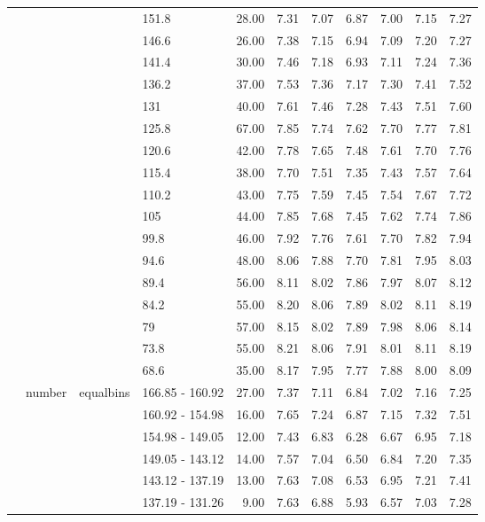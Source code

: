 \begin{longtable}{llllrrrrrrr}
   &  &  & 151.8 & 28.00 & 7.31 & 7.07 & 6.87 & 7.00 & 7.15 & 7.27 \\ 
   &  &  & 146.6 & 26.00 & 7.38 & 7.15 & 6.94 & 7.09 & 7.20 & 7.27 \\ 
   &  &  & 141.4 & 30.00 & 7.46 & 7.18 & 6.93 & 7.11 & 7.24 & 7.36 \\ 
   &  &  & 136.2 & 37.00 & 7.53 & 7.36 & 7.17 & 7.30 & 7.41 & 7.52 \\ 
   &  &  & 131 & 40.00 & 7.61 & 7.46 & 7.28 & 7.43 & 7.51 & 7.60 \\ 
   &  &  & 125.8 & 67.00 & 7.85 & 7.74 & 7.62 & 7.70 & 7.77 & 7.81 \\ 
   &  &  & 120.6 & 42.00 & 7.78 & 7.65 & 7.48 & 7.61 & 7.70 & 7.76 \\ 
   &  &  & 115.4 & 38.00 & 7.70 & 7.51 & 7.35 & 7.43 & 7.57 & 7.64 \\ 
   &  &  & 110.2 & 43.00 & 7.75 & 7.59 & 7.45 & 7.54 & 7.67 & 7.72 \\ 
   &  &  & 105 & 44.00 & 7.85 & 7.68 & 7.45 & 7.62 & 7.74 & 7.86 \\ 
   &  &  & 99.8 & 46.00 & 7.92 & 7.76 & 7.61 & 7.70 & 7.82 & 7.94 \\ 
   &  &  & 94.6 & 48.00 & 8.06 & 7.88 & 7.70 & 7.81 & 7.95 & 8.03 \\ 
   &  &  & 89.4 & 56.00 & 8.11 & 8.02 & 7.86 & 7.97 & 8.07 & 8.12 \\ 
   &  &  & 84.2 & 55.00 & 8.20 & 8.06 & 7.89 & 8.02 & 8.11 & 8.19 \\ 
   &  &  & 79 & 57.00 & 8.15 & 8.02 & 7.89 & 7.98 & 8.06 & 8.14 \\ 
   &  &  & 73.8 & 55.00 & 8.21 & 8.06 & 7.91 & 8.01 & 8.11 & 8.19 \\ 
   &  &  & 68.6 & 35.00 & 8.17 & 7.95 & 7.77 & 7.88 & 8.00 & 8.09 \\ 
   & number & equalbins & 166.85 - 160.92 & 27.00 & 7.37 & 7.11 & 6.84 & 7.02 & 7.16 & 7.25 \\ 
   &  &  & 160.92 - 154.98 & 16.00 & 7.65 & 7.24 & 6.87 & 7.15 & 7.32 & 7.51 \\ 
   &  &  & 154.98 - 149.05 & 12.00 & 7.43 & 6.83 & 6.28 & 6.67 & 6.95 & 7.18 \\ 
   &  &  & 149.05 - 143.12 & 14.00 & 7.57 & 7.04 & 6.50 & 6.84 & 7.20 & 7.35 \\ 
   &  &  & 143.12 - 137.19 & 13.00 & 7.63 & 7.08 & 6.53 & 6.95 & 7.21 & 7.41 \\ 
   &  &  & 137.19 - 131.26 & 9.00 & 7.63 & 6.88 & 5.93 & 6.57 & 7.03 & 7.28 \\ 

\end{longtable}
